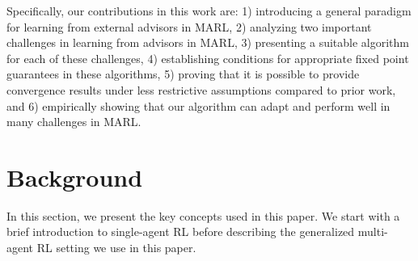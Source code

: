 \documentclass[jair, twoside,11pt,theapa]{article}
\begin{document}


Specifically, our contributions in this work are: 1) introducing a general paradigm for learning from external advisors in MARL, 2) analyzing two important challenges in learning from advisors in MARL, 3) presenting a suitable algorithm for each of these challenges, 4) establishing conditions for appropriate fixed point guarantees in these algorithms, 5) proving that it is possible to provide convergence results under less restrictive assumptions compared to prior work, and 6) empirically showing that our algorithm can adapt and perform well in many challenges in MARL. 



\section{Background}\label{sec:background}

In this section, we present the key concepts used in this paper. We start with a brief introduction to single-agent RL before describing the generalized multi-agent RL setting we use in this paper.  
\end{document}
